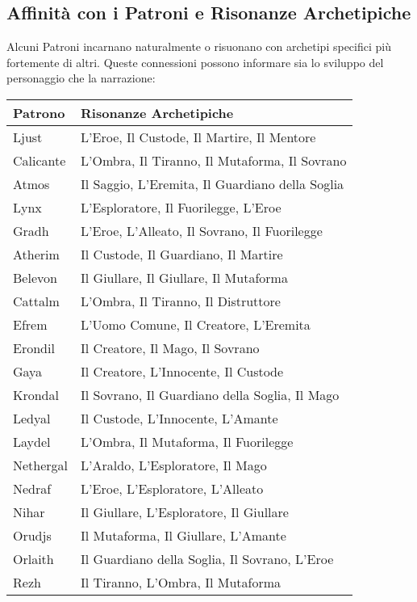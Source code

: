 \begin{multicols}{2}
\section*{Affinità con i Patroni e Risonanze Archetipiche}

Alcuni Patroni incarnano naturalmente o risuonano con archetipi specifici più fortemente di altri. Queste connessioni possono informare sia lo sviluppo del personaggio che la narrazione:

\noindent\begin{tabularx}{\columnwidth}{lX}
\toprule
\textbf{Patrono} & \textbf{Risonanze Archetipiche} \\
\midrule
Ljust & L'Eroe, Il Custode, Il Martire, Il Mentore \\
\hline
Calicante & L'Ombra, Il Tiranno, Il Mutaforma, Il Sovrano \\
\hline
Atmos & Il Saggio, L'Eremita, Il Guardiano della Soglia \\
\hline
Lynx & L'Esploratore, Il Fuorilegge, L'Eroe \\
\hline
Gradh & L'Eroe, L'Alleato, Il Sovrano, Il Fuorilegge \\
\hline
Atherim & Il Custode, Il Guardiano, Il Martire \\
\hline
Belevon & Il Giullare, Il Giullare, Il Mutaforma \\
\hline
Cattalm & L'Ombra, Il Tiranno, Il Distruttore \\
\hline
Efrem & L'Uomo Comune, Il Creatore, L'Eremita \\
\hline
Erondil & Il Creatore, Il Mago, Il Sovrano \\
\hline
Gaya & Il Creatore, L'Innocente, Il Custode \\
\hline
Krondal & Il Sovrano, Il Guardiano della Soglia, Il Mago \\
\hline
Ledyal & Il Custode, L'Innocente, L'Amante \\
\hline
Laydel & L'Ombra, Il Mutaforma, Il Fuorilegge \\
\hline
Nethergal & L'Araldo, L'Esploratore, Il Mago \\
\hline
Nedraf & L'Eroe, L'Esploratore, L'Alleato \\
\hline
Nihar & Il Giullare, L'Esploratore, Il Giullare \\
\hline
Orudjs & Il Mutaforma, Il Giullare, L'Amante \\
\hline
Orlaith & Il Guardiano della Soglia, Il Sovrano, L'Eroe \\
\hline
Rezh & Il Tiranno, L'Ombra, Il Mutaforma \\

\end{tabularx}
\end{multicols}
